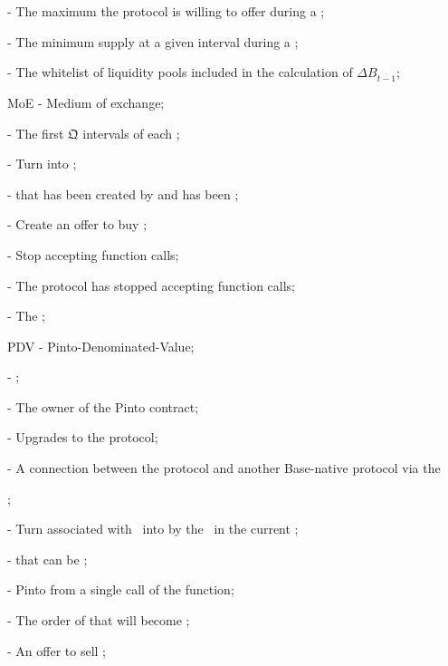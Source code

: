 \documentclass[class=article, crop=false]{standalone}
\begin{document}
\begin{itemize}[topsep=0pt, itemsep=3pt,leftmargin=16pt]
{    \item[]  - The maximum  the protocol is willing to offer during a ;
    \item[]  - The minimum  supply at a given interval during a ;
    \item[]  - The whitelist of liquidity pools included in the calculation of $\Delta B_{\overline{t-1}}$;
    \item[] MoE - Medium of exchange;
    \item[]  - The first $\mathfrak{Q}$ intervals of each ;
    \item[]  - Turn  into ;
    \item[]  -  that has been created by  and has been ;
    \item[]  - Create an offer to buy ;
    \item[]  - Stop accepting  function calls;
    \item[]  - The protocol has stopped accepting  function calls;
    \item[]  - The ;
    \item[] PDV - Pinto-Denominated-Value;
    \item[]  - ;
    \item[]  - The owner of the Pinto contract;
    \item[]  - Upgrades to the protocol;    
    \item[]  - A connection between the protocol and another Base-native protocol via the };
    \item[]  - Turn  associated with  \Pinto\ into  by  the  \Pinto\ in the current ;
    \item[]  -  that can be ;
    \item[]  - Pinto  from a single call of the  function;
    \item[]  - The order of  that will become ;
    \item[]  - An offer to sell ;

\end{itemize}
\end{document}
